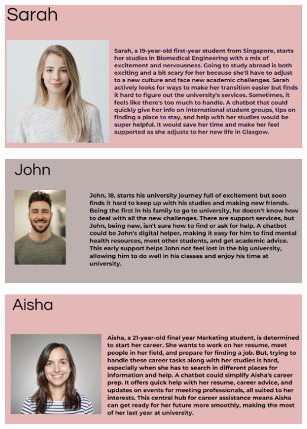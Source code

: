 \documentclass{l4proj}
\begin{document}
\begin{appendices}
\vspace{-10pt} 
\noindent\begin{minipage}{\linewidth}
    \centering
    \includegraphics[width=\linewidth]{images/Sarah.png}
\end{minipage}

\vspace{-10pt} 

\noindent\begin{minipage}{\linewidth}
    \centering
    \includegraphics[width=\linewidth]{images/John.png}
\end{minipage}

\vspace{-10pt} 

\noindent\begin{minipage}{\linewidth}
    \centering
    \includegraphics[width=\linewidth]{images/Aisha.png}
\end{minipage}


\end{appendices}
\end{document}
